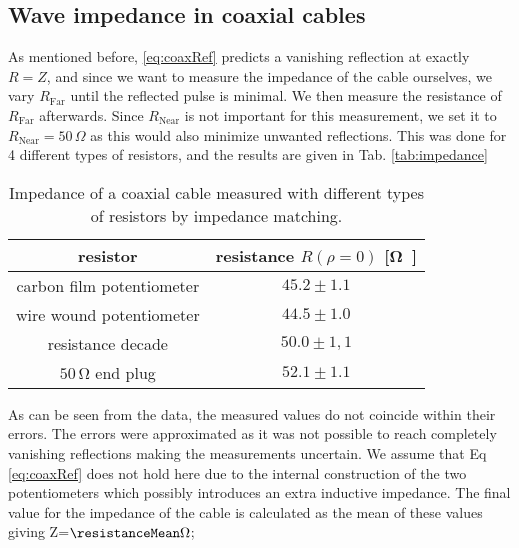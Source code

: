 \documentclass[a4paper,10pt,twocolumn]{article}
\begin{document}
    \subsection{Wave impedance in coaxial cables}
    As mentioned before, \autoref{eq:coaxRef} predicts a vanishing reflection at exactly $R=Z$, and since we want to measure the impedance of the cable ourselves, we vary $R_{\text{Far}}$ until the reflected pulse is minimal.
    We then measure the resistance of $R_{\text{Far}}$ afterwards.
    Since $R_{\text{Near}}$ is not important for this measurement, we set it to $R_{\text{Near}}=50\,\Omega$ as this would also minimize unwanted reflections.
    This was done for 4 different types of resistors, and the results are given in Tab. \autoref{tab:impedance}
    \begin{table}[htbp]          %
        \centering
        \begin{tabular*}{\linewidth}{@{\extracolsep{\fill}}cc}
            \hline
            \hline
            \rule[-7pt]{0pt}{23pt}  resistor  &  resistance $R(\rho=0)$ [\si\ohm]  	 \\
            \hline
            \rule[-5pt]{0pt}{23pt}   carbon film potentiometer   &   $45.2 \pm 1.1$  	 \\
            \rule[-5pt]{0pt}{23pt}   wire wound potentiometer   &   $44.5 \pm 1.0$  	 \\
            \rule[-5pt]{0pt}{23pt}   resistance decade   &   $50.0 \pm 1,1$  	 \\
            \rule[-5pt]{0pt}{23pt}   $50\,\si\ohm$ end plug   &   $52.1 \pm 1.1$  	 \\
            \hline
            \hline
        \end{tabular*}
        \normalsize
        \caption[]{Impedance of a coaxial cable measured with different types of resistors by impedance matching.}  %
        \label{tab:impedance}                             %
    \end{table}
    
    As can be seen from the data, the measured values do not coincide within their errors.
    The errors were approximated as it was not possible to reach completely vanishing reflections making the measurements uncertain.
    We assume that Eq \ref{eq:coaxRef} does not hold here due to the internal construction of the two potentiometers which possibly introduces an extra inductive impedance.
    The final value for the impedance of the cable is calculated as the mean of these values giving Z=$\resistanceMean \Omega$;
\end{document}
